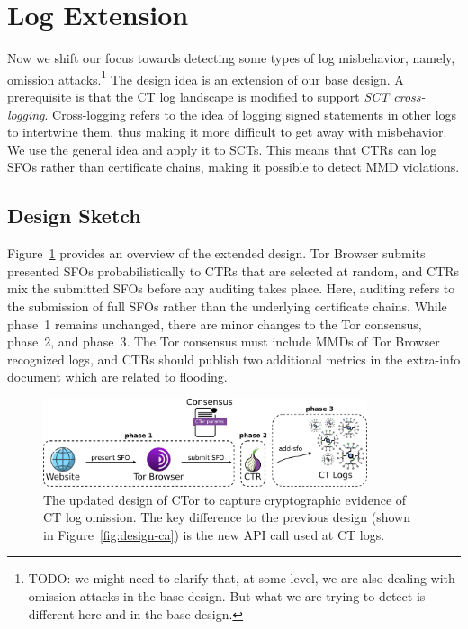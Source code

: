 \section{Log Extension} \label{sec:log}
Now we shift our focus towards detecting some types of log misbehavior, namely,
omission attacks.\footnote{%
	TODO: we might need to clarify that, at some level, we are also dealing with
	omission attacks in the base design.  But what we are trying to detect is
	different here and in the base design.
} The design idea is an
extension of our base design.  A prerequisite is that the CT log landscape
is modified to support \emph{SCT cross-logging}.  Cross-logging refers to the
idea of logging signed statements in other logs to intertwine
them, thus making it more difficult to get away with
misbehavior.  We use the general idea and apply it to SCTs.  This means that
CTRs can log SFOs rather than certificate chains, making it possible to detect
MMD violations.

\subsection{Design Sketch}
Figure~\ref{fig:ext-log} provides an overview of the extended design.  Tor
Browser submits presented SFOs probabilistically to CTRs that are selected
at random, and CTRs mix the submitted SFOs before any auditing takes place.
Here, auditing refers to the submission of full SFOs rather than the underlying
certificate chains.  While phase~1 remains unchanged, there are minor changes
to the Tor consensus, phase~2, and phase~3.  The Tor consensus must include MMDs
of Tor Browser recognized logs, and CTRs should publish two additional metrics
in the extra-info document which are related to flooding.

\begin{figure}
    \centering
    \includegraphics[width=0.85\textwidth]{img/design-log}
	\caption{The updated design of CTor to capture cryptographic evidence of CT
	log omission. The key difference to the previous design (shown in
	Figure~\ref{fig:design-ca}) is the new API call used at CT logs.}
    \label{fig:ext-log}
\end{figure}

